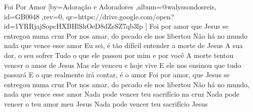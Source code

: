 \beginsong
{Foi Por Amor %
}[by={Adoração e Adoradores %
},album={@walyssondosreis},
id={GB0048 %
},rev={0}, %
qr={https://drive.google.com/open?id=1YRRjajSopcHXBHlShOeD8dZsSZ7qb3lp %
}]
\beginverse*
Foi por amor que Jesus se entregou numa cruz
Por nos amar, do pecado ele nos libertou
Não há no mundo nada que vence esse amor
\endverse
\beginverse*
Eu sei, é tão difícil entender a morte de Jesus
A sua dor, o seu sofrer
Tudo o que ele passou por mim e por você
\endverse
\beginverse*
A morte tentou vencer o amor de Jesus
Mas ele venceu e hoje vive
E ele nos ensinou que tudo passará
E o que realmente irá contar, é o amor
\endverse
\beginchorus
Foi por amor, que Jesus se entregou numa cruz
Por nos amar, do pecado ele nos libertou
Não há no mundo, nada que vence esse amor
\endchorus
\beginverse*
Nada pode vencer teu sacrifício na cruz
Nada pode vencer o teu amor meu Jesus
Nada pode vencer teu sacrifício Jesus
\endverse
\vspace{4em} %
\begin{comment}
\lstset{basicstyle=\scriptsize\bf} %
\tab{Solo 1}
\begin{lstlisting}
E|-----------------------------------------------------|
B|-----------------------------------------------------|
G|-----------------------------------------------------|
D|-----------------------------------------------------|
A|-----------------------------------------------------|
E|-----------------------------------------------------|
\end{lstlisting}
\end{comment}
 
